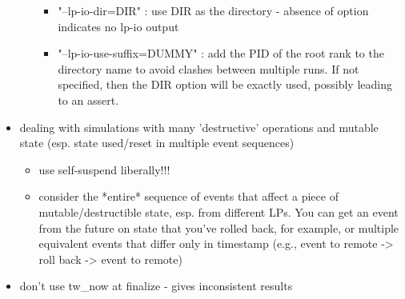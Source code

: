 \documentclass[conference,10pt,compsocconf,onecolumn]{IEEEtran}
\begin{document}
\begin{itemize}
\begin{itemize}
                \begin{itemize}
                    \item "--lp-io-dir=DIR" : use DIR as the directory -
                        absence of option indicates no lp-io output
                    \item "--lp-io-use-suffix=DUMMY" : add the PID of the root
                        rank to the directory name to avoid clashes between
                        multiple runs. If not specified, then the DIR option
                        will be exactly used, possibly leading to an assert.
                \end{itemize}
        \end{itemize}

    \item dealing with simulations with many 'destructive' operations and
        mutable state (esp. state used/reset in multiple event sequences)
          \begin{itemize}
              \item use self-suspend liberally!!!
              \item consider the *entire* sequence of events that affect a
                  piece of mutable/destructible state, esp. from different LPs.
                  You can get an event from the future on state that you've
                  rolled back, for example, or multiple equivalent events that
                  differ only in timestamp (e.g., event to remote -> roll back
                  -> event to remote)
          \end{itemize}
    \item don't use tw\_now at finalize - gives inconsistent results
\end{itemize}

\begin{comment} ==== SCRATCH MATERIAL ====
\begin{figure}
\begin{lstlisting}[caption=Example code snippet., label=snippet-example]
for (i=0; i<n; i++) {
    for (j=0; j<i; j++) {
        /* do something */
    }
}
\end{lstlisting}
\end{figure}

Figure ~\ref{fig:snippet-example} shows an example of how to show a code
snippet in latex.  We can use this format as needed throughout the document.
\end{comment}
\end{document}
